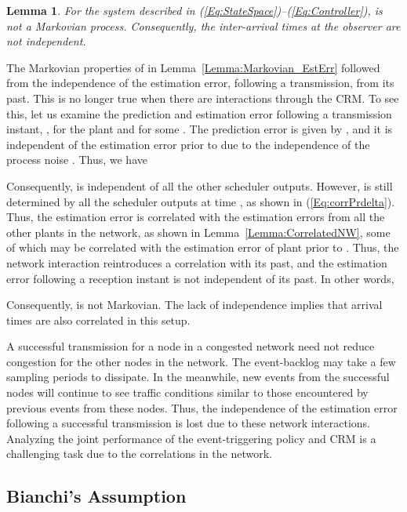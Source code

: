 \documentclass[journal]{IEEEtran}
\newtheorem{lemma}[theorem]{Lemma}
\begin{document}
\begin{lemma} \label{Lemma:LostProp}
For the system described in (\ref{Eq:StateSpace})--(\ref{Eq:Controller}),  is not a Markovian process. Consequently, the inter-arrival times at the observer are not independent.
\end{lemma}
\begin{IEEEproof}
The Markovian properties of  in Lemma~\ref{Lemma:Markovian_EstErr} followed from the independence of the estimation error, following a transmission, from its past. This is no longer true when there are interactions through the CRM. To see this, let us examine the prediction and estimation error following a transmission instant, , for the  plant and for some . The prediction error is given by , and it is independent of the estimation error prior to  due to the independence of the process noise . Thus, we have


Consequently,  is independent of all the other scheduler outputs. However,  is still determined by all the scheduler outputs at time , as shown in (\ref{Eq:corrPrdelta}). Thus, the estimation error  is correlated with the estimation errors from all the other plants in the network, as shown in Lemma~\ref{Lemma:CorrelatedNW}, some of which may be correlated with the estimation error of plant  prior to . Thus, the network interaction reintroduces a correlation with its past, and the estimation error following a reception instant is not independent of its past. In other words,

Consequently,  is not Markovian. The lack of independence implies that arrival times are also correlated in this setup.
\end{IEEEproof}

A successful transmission for a node in a congested network need not reduce congestion for the other nodes in the network. The event-backlog may take a few sampling periods to dissipate. In the meanwhile, new events from the successful nodes will continue to see traffic conditions similar to those encountered by previous events from these nodes. Thus, the independence of the estimation error following a successful transmission is lost due to these network interactions. Analyzing the joint performance of the event-triggering policy and CRM is a challenging task due to the correlations in the network.

\subsection{Bianchi's Assumption} \label{S:BianchiAssumption}
\end{document}
